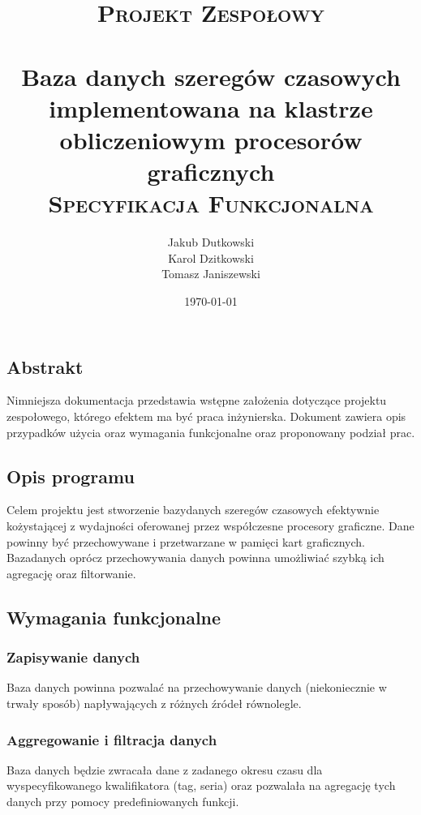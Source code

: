 \documentclass[paper=a4, fontsize=11pt]{scrartcl} %
\title{
\vspace*{\fill}
\normalfont
\textsc{Projekt Zespołowy}\\ [20pt]
\horrule{1.5pt} \\[0.4cm] %
\LARGE Baza danych szeregów czasowych implementowana na klastrze obliczeniowym procesorów graficznych
\horrule{1.5pt} \\[0.1cm] %
\normalsize
\textsc{Specyfikacja Funkcjonalna} \\ [20pt]
\vspace*{\fill}
}
\author{Jakub Dutkowski \\ Karol Dzitkowski \\ Tomasz Janiszewski } %
\date{\normalsize\today} %
\numberwithin{equation}{section} %
\numberwithin{figure}{section} %
\numberwithin{table}{section} %
\begin{document}
\maketitle

\thispagestyle{empty}
\clearpage

\tableofcontents
\listoffigures

\chapter{}

\clearpage

\vspace{4em}


\section{Abstrakt}
Nimniejsza dokumentacja przedstawia wstępne założenia dotyczące projektu zespołowego, którego efektem ma być praca inżynierska.
Dokument zawiera opis przypadków użycia oraz wymagania funkcjonalne oraz proponowany podział prac.

\section{Opis programu}
Celem projektu jest stworzenie bazydanych szeregów czasowych efektywnie kożystającej z wydajności oferowanej przez współczesne
procesory graficzne. Dane powinny być przechowywane i przetwarzane w pamięci kart graficznych. Bazadanych oprócz przechowywania
danych powinna umożliwiać szybką ich agregację oraz filtorwanie.

\section{Wymagania funkcjonalne}
    \subsection{Zapisywanie danych}
    Baza danych powinna pozwalać na przechowywanie danych (niekoniecznie w trwały sposób) napływających z różnych źródeł
    równolegle.
    \subsection{Aggregowanie i filtracja danych }
    Baza danych będzie zwracała dane z zadanego okresu czasu dla wyspecyfikowanego kwalifikatora (tag, seria) oraz pozwalała
    na agregację tych danych przy pomocy predefiniowanych funkcji.
\end{document}
